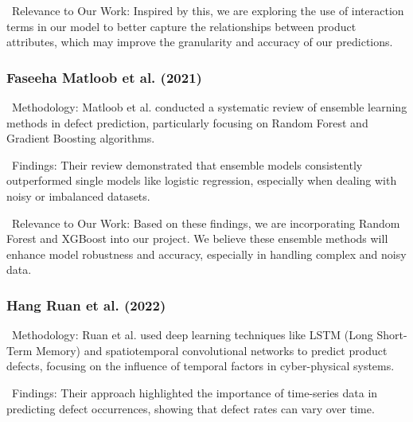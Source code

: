 \documentclass[conference]{IEEEtran}
\begin{document}
\noindent \textbullet\ Relevance to Our Work: Inspired by this, we are exploring the use of interaction terms in our model to better capture the relationships between product attributes, which may improve the granularity and accuracy of our predictions.


\subsubsection{Faseeha Matloob et al. (2021) \cite{matloob2021software}}


\noindent \textbullet\ Methodology: Matloob et al. conducted a systematic review of ensemble learning methods in defect prediction, particularly focusing on Random Forest and Gradient Boosting algorithms.

\noindent \textbullet\ Findings: Their review demonstrated that ensemble models consistently outperformed single models like logistic regression, especially when dealing with noisy or imbalanced datasets.

\noindent \textbullet\ Relevance to Our Work: Based on these findings, we are incorporating Random Forest and XGBoost into our project. We believe these ensemble methods will enhance model robustness and accuracy, especially in handling complex and noisy data.

\subsubsection{Hang Ruan et al. (2022) \cite{ruan2022deep}}

\noindent \textbullet\ Methodology: Ruan et al. used deep learning techniques like LSTM (Long Short-Term Memory) and spatiotemporal convolutional networks to predict product defects, focusing on the influence of temporal factors in cyber-physical systems. 

\noindent \textbullet\ Findings: Their approach highlighted the importance of time-series data in predicting defect occurrences, showing that defect rates can vary over time.
\end{document}
